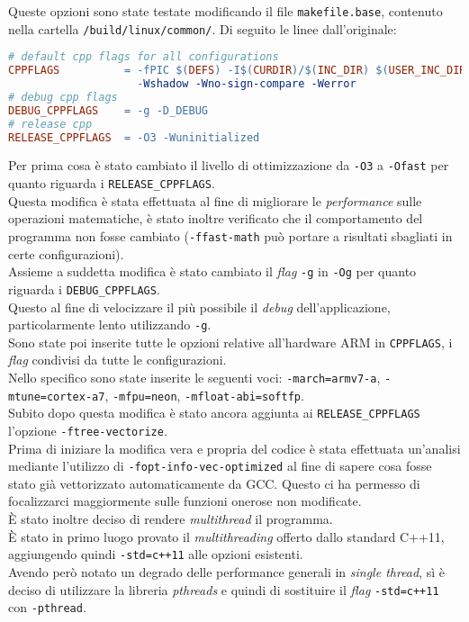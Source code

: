 Queste opzioni sono state testate modificando il file \verb|makefile.base|, 
contenuto nella cartella \verb|/build/linux/common/|. Di seguito le linee 
dall'originale: 

\begin{lstlisting}[language=make]
# default cpp flags for all configurations
CPPFLAGS          = -fPIC $(DEFS) -I$(CURDIR)/$(INC_DIR) $(USER_INC_DIRS) -Wall
                    -Wshadow -Wno-sign-compare -Werror
# debug cpp flags
DEBUG_CPPFLAGS    = -g -D_DEBUG
# release cpp
RELEASE_CPPFLAGS  = -O3 -Wuninitialized
\end{lstlisting}

Per prima cosa è stato cambiato il livello di ottimizzazione da \verb|-O3| a 
\verb|-Ofast| per quanto riguarda i \verb|RELEASE_CPPFLAGS|.\\
Questa modifica è stata effettuata al fine di migliorare le \emph{performance} 
sulle operazioni matematiche, è stato inoltre verificato che il comportamento 
del programma non fosse cambiato (\verb|-ffast-math| può portare a risultati 
sbagliati in certe configurazioni).\\
Assieme a suddetta modifica è stato cambiato il \emph{flag} \verb|-g| in 
\verb|-Og| per quanto riguarda i \verb|DEBUG_CPPFLAGS|.\\
Questo al fine di velocizzare il più possibile il \emph{debug} 
dell'applicazione, particolarmente lento utilizzando \verb|-g|.\\
Sono state poi inserite tutte le opzioni relative all'hardware ARM in 
\verb|CPPFLAGS|, i \emph{flag} condivisi da tutte le configurazioni.\\
Nello specifico sono state inserite le seguenti voci: \verb|-march=armv7-a|, 
\verb|-mtune=cortex-a7|, \verb|-mfpu=neon|, \verb|-mfloat-abi=softfp|.\\
Subito dopo questa modifica è stato ancora aggiunta ai \verb|RELEASE_CPPFLAGS| 
l'opzione \verb|-ftree-vectorize|.\\

Prima di iniziare la modifica vera e propria del codice è stata effettuata 
un'analisi mediante l'utilizzo di \verb|-fopt-info-vec-optimized| al fine di 
sapere cosa fosse stato già vettorizzato automaticamente da GCC. Questo ci ha 
permesso di focalizzarci maggiormente sulle funzioni onerose non modificate.\\

\`E stato inoltre deciso di rendere \emph{multithread} il programma.\\
\`E stato in primo luogo provato il \emph{multithreading} offerto dallo 
standard C++11, aggiungendo quindi \verb|-std=c++11| alle opzioni esistenti.\\
Avendo però notato un degrado delle performance generali in \emph{single 
thread}, sì è deciso di utilizzare la libreria \emph{pthreads} e quindi di 
sostituire il \emph{flag} \verb|-std=c++11| con \verb|-pthread|.

